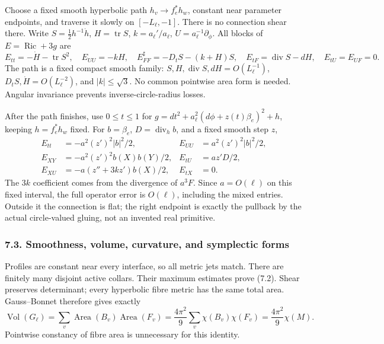 \documentclass[
  english,
]{article}
\begin{document}
Choose a fixed smooth hyperbolic path \(h_v\to f_e^*h_w\), constant near
parameter endpoints, and traverse it slowly on \([-L_\ell,-1]\). There
is no connection shear there. Write \(S=\tfrac12h^{-1}\dot h\),
\(H=\operatorname{tr}S\), \(k=a_\ell'/a_\ell\),
\(U=a_\ell^{-1}\partial_\phi\). All blocks of
\(E=\operatorname{Ric}+3g\) are \[
E_{tt}=-\dot H-\operatorname{tr}S^2,\quad E_{UU}=-kH,\quad
E_{FF}^{\sharp}=-D_tS-(k+H)S,\quad
E_{tF}=\operatorname{div}S-dH,\quad E_{tU}=E_{UF}=0.
\tag{7.3}
\] The path is a fixed compact smooth family:
\(S,H,\operatorname{div}S,dH=O(L_\ell^{-1})\),
\(D_tS,\dot H=O(L_\ell^{-2})\), and \(|k|\le\sqrt3\). No common
pointwise area form is needed. Angular invariance prevents
inverse-circle-radius losses.

After the path finishes, use \(0\le t\le1\) for
\(g=dt^2+a_\ell^2(d\phi+z(t)\beta_e)^2+h\), keeping \(h=f_e^*h_w\)
fixed. For \(b=\beta_e\), \(D=\operatorname{div}_h b\), and a fixed
smooth step \(z\), \[
\begin{aligned}
E_{tt}&=-a^2(z')^2|b|^2/2,& E_{UU}&=a^2(z')^2|b|^2/2,\\
E_{XY}&=-a^2(z')^2b(X)b(Y)/2,& E_{tU}&=az'D/2,\\
E_{XU}&=-a(z''+3kz')b(X)/2,& E_{tX}&=0 .
\end{aligned}
\tag{7.4}
\] The \(3k\) coefficient comes from the divergence of \(a^3F\). Since
\(a=O(\ell)\) on this fixed interval, the full operator error is
\(O(\ell)\), including the mixed entries. Outside it the connection is
flat; the right endpoint is exactly the pullback by the actual
circle-valued gluing, not an invented real primitive.

\hypertarget{smoothness-volume-curvature-and-symplectic-forms}{%
\subsubsection{7.3. Smoothness, volume, curvature, and symplectic
forms}\label{smoothness-volume-curvature-and-symplectic-forms}}

Profiles are constant near every interface, so all metric jets match.
There are finitely many disjoint active collars. Their maximum estimates
prove (7.2). Shear preserves determinant; every hyperbolic fibre metric
has the same total area. Gauss--Bonnet therefore gives exactly \[
\operatorname{Vol}(G_\ell)
=\sum_v\operatorname{Area}(B_v)\operatorname{Area}(F_v)
=\frac{4\pi^2}{9}\sum_v\chi(B_v)\chi(F_v)
=\frac{4\pi^2}{9}\chi(M).
\] Pointwise constancy of fibre area is unnecessary for this identity.
\end{document}
